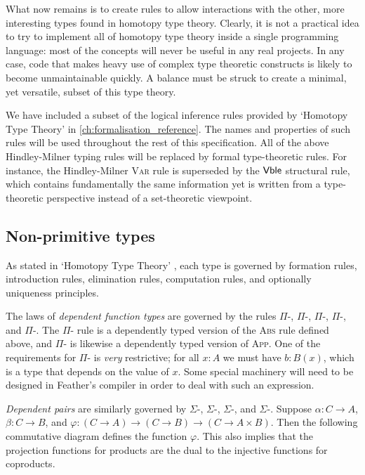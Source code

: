 \documentclass[UKenglish, 11pt, a4paper, parskip=half]{scrbook}
\begin{document}
What now remains is to create rules to allow interactions with the other, more interesting types found in homotopy type theory.
Clearly, it is not a practical idea to try to implement all of homotopy type theory inside a single programming language: most of the concepts will never be useful in any real projects.
In any case, code that makes heavy use of complex type theoretic constructs is likely to become unmaintainable quickly.
A balance must be struck to create a minimal, yet versatile, subset of this type theory.

We have included a subset of the logical inference rules provided by `Homotopy Type Theory' \cite{hottbook} in \cref{ch:formalisation_reference}.
The names and properties of such rules will be used throughout the rest of this specification.
All of the above Hindley-Milner typing rules will be replaced by formal type-theoretic rules.
For instance, the Hindley-Milner \textsc{Var} rule is superseded by the \(\mathsf{Vble}\) structural rule, which contains fundamentally the same information yet is written from a type-theoretic perspective instead of a set-theoretic viewpoint.

\subsection{Non-primitive types}

As stated in `Homotopy Type Theory' \cite{hottbook}, each type is governed by formation rules, introduction rules, elimination rules, computation rules, and optionally uniqueness principles.

The laws of \textit{dependent function types} are governed by the rules \( \Pi \)-\rform, \( \Pi \)-\rintro, \( \Pi \)-\relim, \( \Pi \)-\rcomp, and \( \Pi \)-\runiq.
The \( \Pi \)-\rintro{} rule is a dependently typed version of the \textsc{Abs} rule defined above, and \( \Pi \)-\relim{} is likewise a dependently typed version of \textsc{App}.
One of the requirements for \( \Pi \)-\rintro{} is \textit{very} restrictive; for all \( x:A \) we must have \( b:B(x) \), which is a type that depends on the value of \( x \).
Some special machinery will need to be designed in Feather's compiler in order to deal with such an expression.

\textit{Dependent pairs} are similarly governed by \( \Sigma \)-\rform, \( \Sigma \)-\rintro, \( \Sigma \)-\relim, and \( \Sigma \)-\rcomp.
Suppose \( \alpha : C \to A \), \( \beta : C \to B \), and \( \varphi : (C \to A) \to (C \to B) \to (C \to A \times B) \).
Then the following commutative diagram defines the function \( \varphi \).
This also implies that the projection functions for products are the dual to the injective functions for coproducts.
\end{document}
